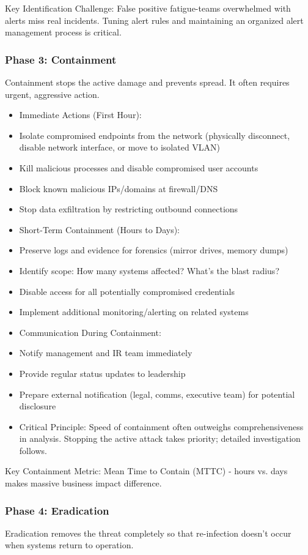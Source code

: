 \documentclass[10pt]{article}
\begin{document}
Key Identification Challenge: False positive fatigue-teams overwhelmed with alerts miss real incidents. Tuning alert rules and maintaining an organized alert management process is critical.

\subsubsection*{Phase 3: Containment}
Containment stops the active damage and prevents spread. It often requires urgent, aggressive action.

\begin{itemize}
  \item Immediate Actions (First Hour):
  \item Isolate compromised endpoints from the network (physically disconnect, disable network interface, or move to isolated VLAN)
  \item Kill malicious processes and disable compromised user accounts
  \item Block known malicious IPs/domains at firewall/DNS
  \item Stop data exfiltration by restricting outbound connections
  \item Short-Term Containment (Hours to Days):
  \item Preserve logs and evidence for forensics (mirror drives, memory dumps)
  \item Identify scope: How many systems affected? What's the blast radius?
  \item Disable access for all potentially compromised credentials
  \item Implement additional monitoring/alerting on related systems
  \item Communication During Containment:
  \item Notify management and IR team immediately
  \item Provide regular status updates to leadership
  \item Prepare external notification (legal, comms, executive team) for potential disclosure
  \item Critical Principle: Speed of containment often outweighs comprehensiveness in analysis. Stopping the active attack takes priority; detailed investigation follows.
\end{itemize}

Key Containment Metric: Mean Time to Contain (MTTC) - hours vs. days makes massive business impact difference.

\subsubsection*{Phase 4: Eradication}
Eradication removes the threat completely so that re-infection doesn't occur when systems return to operation.
\end{document}
